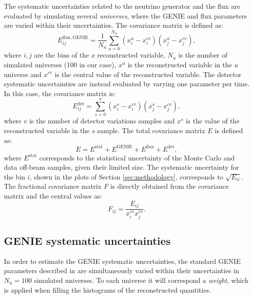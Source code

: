 The systematic uncertainties related to the neutrino generator and the flux are evaluated by simulating several \emph{universes}, where the GENIE and flux parameters are varied within their uncertainties. The covariance matrix is defined as:
\begin{equation}
    E_{ij}^{\mathrm{flux, GENIE}} = \frac{1}{N_{u}} \sum^{N_{u}}_{u=0} (x^{u}_{i} - x^{cv}_{i}) (x^{u}_{j} - x^{cv}_{j}),\label{eq:covariance}
\end{equation}
where $i,j$ are the bins of the $x$ reconstructed variable, $N_{u}$ is the number of simulated universes (100 in our case), $x^{u}$ is the reconstructed variable in the $u$ universe and $x^{cv}$ is the central value of the reconstructed variable. 
The detector systematic uncertainties are instead evaluated by varying one parameter per time. In this case, the covariance matrix is:
\begin{equation}
    E_{ij}^{\mathrm{det}} = \sum^{v}_{s=0} (x^{s}_{i} - x^{cv}_{i}) (x^{s}_{j} - x^{cv}_{j}),\label{eq:cov_det}
\end{equation}
where $v$ is the number of detector variations samples and $x^{s}$ is the value of the reconstructed variable in the $s$ sample. The total covariance matrix $E$ is defined as:
\begin{equation}
    E = E^{\mathrm{stat}} + E^{\mathrm{GENIE}} + E^{\mathrm{flux}} + E^{\mathrm{det}},\label{eq:cov_tot}
\end{equation}
where $E^{\mathrm{stat}}$ corresponds to the statistical uncertainty of the Monte Carlo and data off-beam samples, given their limited size. 
The systematic uncertainty for the bin $i$, shown in the plots of Section \ref{sec:methodology}, corresponds to $\sqrt{E_{ii}}$. The fractional covariance matrix $F$ is directly obtained from the covariance matrix and the central values as:
\begin{equation} 
    F_{ij} = \frac{E_{ij}}{x_{i}^{cv} x_{j}^{cv}}.
\end{equation}

\subsection{GENIE systematic uncertainties}
In order to estimate the GENIE systematic uncertainties, the standard GENIE parameters described in \cite{Andreopoulos:2009rq} are simultaneously varied within their uncertainties in $N_{u} = 100$ simulated universes. To each universe it will correspond a \emph{weight}, which is applied when filling the histograms of the reconstructed quantities.

